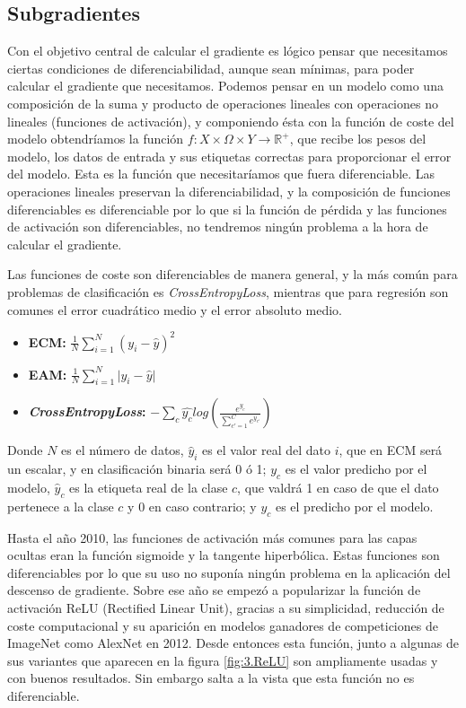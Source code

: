 \subsection{Subgradientes} \label{sec:subgrad}

Con el objetivo central de calcular el gradiente es lógico pensar que necesitamos ciertas condiciones de diferenciabilidad, aunque sean mínimas, para poder calcular el gradiente que necesitamos. Podemos pensar en un modelo como una composición de la suma y producto de operaciones lineales con operaciones no lineales (funciones de activación), y componiendo ésta con la función de coste del modelo obtendríamos la función $f: X \times \Omega \times Y \rightarrow \mathbb{R^+}$, que recibe los pesos del modelo, los datos de entrada y sus etiquetas correctas para proporcionar el error del modelo. Esta es la función que necesitaríamos que fuera diferenciable. Las operaciones lineales preservan la diferenciabilidad, y la composición de funciones diferenciables es diferenciable por lo que si la función de pérdida y las funciones de activación son diferenciables, no tendremos ningún problema a la hora de calcular el gradiente.

Las funciones de coste son diferenciables de manera general, y la más común para problemas de clasificación es \textit{CrossEntropyLoss}, mientras que para regresión son comunes el error cuadrático medio y el error absoluto medio.

\begin{itemize}

    \item \textbf{ECM:} $\frac{1}{N} \sum_{i=1}^N \left (y_i - \hat{y} \right ) ^2$ 

    \item \textbf{EAM:} $\frac{1}{N} \sum_{i=1}^N \lvert y_i - \hat{y} \rvert$ 	

    \item \textbf{\textit{CrossEntropyLoss}:} $  - \sum_c \hat{y_c} log(\frac{e^{y_c}}{\sum_{c'=1}^C e^{y_{c'}}})$
\end{itemize}

 Donde $N$ es el número de datos, $\hat{y}_i$ es el valor real del dato $i$, que en ECM será un escalar, y en clasificación binaria será 0 ó 1; $y_c$ es el valor predicho por el modelo, $\hat{y}_{c}$ es la etiqueta real de la clase $c$, que valdrá 1 en caso de que el dato pertenece a la clase $c$ y 0 en caso contrario; y $y_{c}$ es el predicho por el modelo. 


Hasta el año 2010, las funciones de activación más comunes para las capas ocultas eran la función sigmoide y la tangente hiperbólica. Estas funciones son diferenciables por lo que su uso no suponía ningún problema en la aplicación del descenso de gradiente. Sobre ese año se empezó a popularizar la función de activación ReLU (Rectified Linear Unit), gracias a su simplicidad, reducción de coste computacional y su aparición en modelos ganadores de competiciones de ImageNet como AlexNet en 2012. Desde entonces esta función, junto a algunas de sus variantes que aparecen en la figura \ref{fig:3.ReLU} son ampliamente usadas y con buenos resultados. Sin embargo salta a la vista que esta función no es diferenciable.


